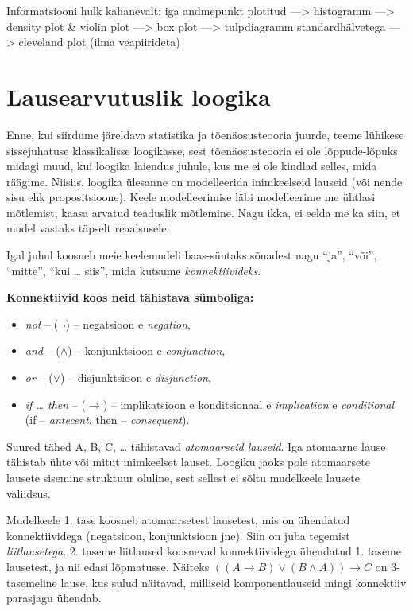 \documentclass[]{book}
\begin{document}
Informatsiooni hulk kahanevalt: iga andmepunkt plotitud
---\textgreater{} histogramm ---\textgreater{} density plot \& violin
plot ---\textgreater{} box plot ---\textgreater{} tulpdiagramm
standardhälvetega ---\textgreater{} cleveland plot (ilma veapiirideta)

\chapter{Lausearvutuslik loogika}\label{lausearvutuslik-loogika}

Enne, kui siirdume järeldava statistika ja tõenäosusteooria juurde,
teeme lühikese sissejuhatuse klassikalisse loogikasse, sest
tõenäosusteooria ei ole lõppude-lõpuks midagi muud, kui loogika laiendus
juhule, kus me ei ole kindlad selles, mida räägime. Niisiis, loogika
ülesanne on modelleerida inimkeelseid lauseid (või nende sisu ehk
propositsioone). Keele modelleerimise läbi modelleerime me ühtlasi
mõtlemist, kaasa arvatud teaduslik mõtlemine. Nagu ikka, ei eelda me ka
siin, et mudel vastaks täpselt reaalsusele.

Igal juhul koosneb meie keelemudeli baas-süntaks sõnadest nagu ``ja'',
``või'', ``mitte'', ``kui \ldots{} siis'', mida kutsume
\emph{konnektiivideks}.

\textbf{Konnektiivid koos neid tähistava sümboliga:}

\begin{itemize}
\item
  \emph{not} -- (\(\lnot\)) -- negatsioon e \emph{negation},
\item
  \emph{and} -- (\(\land\)) -- konjunktsioon e \emph{conjunction},
\item
  \emph{or} -- (\(\lor\)) -- disjunktsioon e \emph{disjunction},
\item
  \emph{if \ldots{} then} -- (\(\rightarrow\)) -- implikatsioon e
  konditsionaal e \emph{implication} e \emph{conditional} (if --
  \emph{antecent}, then -- \emph{consequent}).
\end{itemize}

Suured tähed A, B, C, \ldots{} tähistavad \emph{atomaarseid lauseid}.
Iga atomaarne lause tähistab ühte või mitut inimkeelset lauset. Loogiku
jaoks pole atomaarsete lausete sisemine struktuur oluline, sest sellest
ei sõltu mudelkeele lausete valiidsus.

Mudelkeele 1. tase koosneb atomaarsetest lausetest, mis on ühendatud
konnektiividega (negatsioon, konjunktsioon jne). Siin on juba tegemist
\emph{liitlausetega}. 2. taseme liitlaused koosnevad konnektiividega
ühendatud 1. taseme lausetest, ja nii edasi lõpmatusse. Näiteks
\(((A \rightarrow B) \lor (B \land A)) \rightarrow C\) on 3-tasemeline
lause, kus sulud näitavad, milliseid komponentlauseid mingi konnektiiv
parasjagu ühendab.
\end{document}
